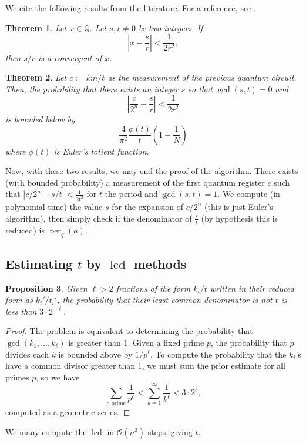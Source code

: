 \documentclass{amsart}
\DeclareMathOperator{\per}{per}
\DeclareMathOperator{\lcd}{lcd}
\newtheorem{theorem}{Theorem}[section]
\newtheorem{proposition}[theorem]{Proposition}
\theoremstyle{definition}
\theoremstyle{remark}
\newcommand{\abs}[1] {
  \left| #1 \right|}
\begin{document}
We cite the following results from the literature. For a reference, see
\cite{math}.

\begin{theorem}
    Let $x \in \mathbb{Q}$. Let $s, r \neq 0$ be two integers. If
    \[
        \abs{x - \frac{s}{r}} < \frac{1}{2 r^2},
    \]
    then $s/r$ is a convergent of $x$.
\end{theorem}

\begin{theorem}
    Let $c := km/t$ as the measurement of the previous quantum circuit. Then,
    the probability that there exists an integer $s$ so that $\gcd(s, t) = 0$
    and
    \[
        \abs{\frac{c}{2^n} - \frac{s}{r}} < \frac{1}{2r^2}
    \]
    is bounded below by
    \[
        \frac{4}{\pi^2} \frac{\phi(t)}{t} \left( 1 - \frac{1}{N} \right)
    \]
    where $\phi(t)$ is Euler's totient function.
\end{theorem}

Now, with these two results, we may end the proof of the algorithm. There exists
(with bounded probability) a measurement of the first quantum register $c$ such
that $\abs{c/2^n - s/t} < \frac{1}{2t^2}$ for $t$ the period and $\gcd(s, t) =
1$. We compute (in polynomial time) the value $s$ for the expansion of $c/2^n$
(this is just Euler's algorithm), then simply check if the denominator of
$\frac{s}{t}$ (by hypothesis this is reduced) is $\per_q(a)$.

\subsection{Estimating $t$ by $\lcd$ methods}

\begin{proposition}
    Given $\ell > 2$ fractions of the form $k_i/t$ written in their reduced form
    as $k_i'/t_i'$, the probability that their least common denominator is not
    $t$ is less than $3 \cdot 2^{-\ell}$.
\end{proposition}

\begin{proof}
    The problem is equivalent to determining the probability that $\gcd(k_1, \dots,
    k_\ell)$ is greater than $1$. Given a fixed prime $p$, the probability that
    $p$ divides each $k$ is bounded above by $1/p^\ell$. To compute the
    probability that the $k_i$'s have a common divisor greater than $1$, we must
    sum the prior estimate for all primes $p$, so we have
    \[
        \sum_{\text{$p$ prime}} \frac{1}{p^\ell} < \sum_{k = 1}^{\infty}
        \frac{1}{k^\ell} < 3 \cdot 2^{\ell},
    \]
    computed as a geometric series.
\end{proof}

We many compute the $\lcd$ in $\mathcal{O}(n^3)$ steps, giving $t$.



\end{document}
